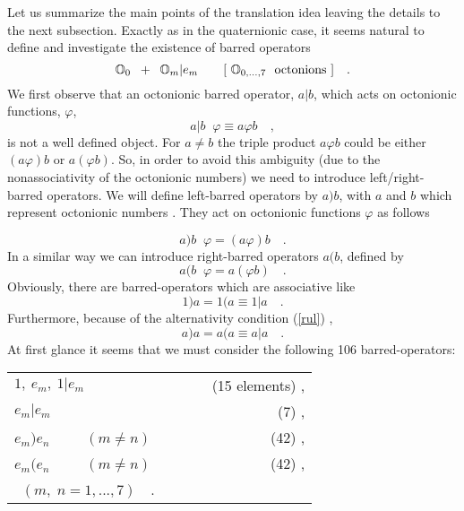 \documentclass[a4paper,12pt]{book}
\begin{document}
Let us summarize the main points of the translation idea leaving the details
to the next subsection. Exactly as in the quaternionic case, it seems
natural to define and investigate the existence of barred operators 
\begin{equation}
\Bbb{O}_{0}\;\;+\;\;\Bbb{O}_{m}|e_{m}\quad \quad [~\Bbb{O}_{0,...,7}~~%
\mbox{octonions}~]\quad .
\end{equation}
We first observe that an octonionic barred operator, $a|b$, which acts on
octonionic functions, $\varphi $, 
\[
a|b\;\;\varphi \equiv a\varphi b\quad , 
\]
is not a well defined object. For $a\neq b$ the triple product $a\varphi b$
could be either $(a\varphi )b$ or $a(\varphi b)$. So, in order to avoid this
ambiguity (due to the nonassociativity of the octonionic numbers) we need to
introduce left/right-barred operators. We will define left-barred operators
by $a)b$, with $a$ and $b$ which represent octonionic numbers \cite{shaeffer}%
\cite{kh2}. They act on octonionic functions $\varphi $ as follows

\begin{equation}
a\mathbf{)}b\;\;\varphi =(a\varphi )b\quad .
\end{equation}
In a similar way we can introduce right-barred operators $a\mathbf{(}b$,
defined by 
\begin{equation}
a\mathbf{(}b\;\;\varphi =a(\varphi b)\quad .
\end{equation}
Obviously, there are barred-operators which are associative like 
\[
1\mathbf{)}a=1\mathbf{(}a\equiv 1|a\quad . 
\]
Furthermore, because of the alternativity condition (\ref{rul}) , 
\[
a\mathbf{)}a=a\mathbf{(}a\equiv a|a\quad . 
\]
At first glance it seems that we must consider the following 106
barred-operators:

\begin{center}
\begin{tabular}{lr}
$1,~e_{m},~1|e_{m}$ & {\ ~~~~~(15 elements)} , \\ 
$e_{m}|e_{m}$ & {\ (7)} , \\ 
$e_{m}\mathbf{)}e_{n}$~~~~{\ $(m\neq n)$} & {\ (42)} , \\ 
$e_{m}\mathbf{(}e_{n}$~~~~{\ $(m\neq n)$} & {\ (42)} , \\ 
{\ $(m,\;n=1,...,7)\quad .$} & 
\end{tabular}
\end{center}
\end{document}
